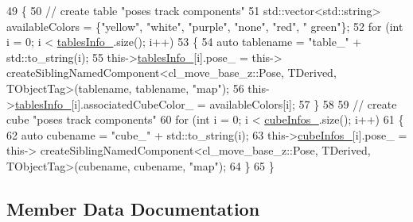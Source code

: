 \begin{DoxyCode}
49             \{
50                 \textcolor{comment}{// create table "poses track components"}
51                 std::vector<std::string> availableColors = \{\textcolor{stringliteral}{"yellow"}, \textcolor{stringliteral}{"white"}, \textcolor{stringliteral}{"purple"}, \textcolor{stringliteral}{"none"}, \textcolor{stringliteral}{"red"}, \textcolor{stringliteral}{"
      green"}\};
52                 \textcolor{keywordflow}{for} (\textcolor{keywordtype}{int} i = 0; i < \hyperlink{classsm__moveit__4_1_1cl__perception__system_1_1CpSceneState_a95f74dd16566d97e017650ccdf4b8a46}{tablesInfo\_}.size(); i++)
53                 \{
54                     \textcolor{keyword}{auto} tablename = \textcolor{stringliteral}{"table\_"} + std::to\_string(i);
55                     this->\hyperlink{classsm__moveit__4_1_1cl__perception__system_1_1CpSceneState_a95f74dd16566d97e017650ccdf4b8a46}{tablesInfo\_}[i].pose\_ = this->
      createSiblingNamedComponent<cl\_move\_base\_z::Pose, TDerived, TObjectTag>(tablename, tablename, \textcolor{stringliteral}{"map"});
56                     this->\hyperlink{classsm__moveit__4_1_1cl__perception__system_1_1CpSceneState_a95f74dd16566d97e017650ccdf4b8a46}{tablesInfo\_}[i].associatedCubeColor\_ = availableColors[i];
57                 \}
58 
59                 \textcolor{comment}{// create cube "poses track components"}
60                 \textcolor{keywordflow}{for} (\textcolor{keywordtype}{int} i = 0; i < \hyperlink{classsm__moveit__4_1_1cl__perception__system_1_1CpSceneState_a734a45934cccf19ac5c886cd94bc8cda}{cubeInfos\_}.size(); i++)
61                 \{
62                     \textcolor{keyword}{auto} cubename = \textcolor{stringliteral}{"cube\_"} + std::to\_string(i);
63                     this->\hyperlink{classsm__moveit__4_1_1cl__perception__system_1_1CpSceneState_a734a45934cccf19ac5c886cd94bc8cda}{cubeInfos\_}[i].pose\_ = this->
      createSiblingNamedComponent<cl\_move\_base\_z::Pose, TDerived, TObjectTag>(cubename, cubename, \textcolor{stringliteral}{"map"});
64                 \}
65             \}
\end{DoxyCode}


\subsection{Member Data Documentation}
\mbox{\label{classsm__moveit__4_1_1cl__perception__system_1_1CpSceneState_a734a45934cccf19ac5c886cd94bc8cda}} 
